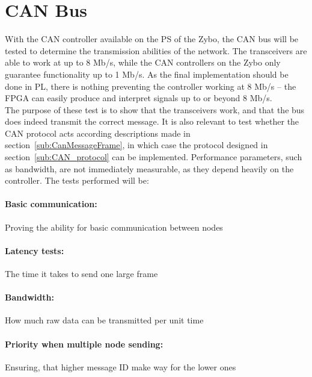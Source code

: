 
\section{CAN Bus}
\label{sub:CAN_Bus_Tests}
With the CAN controller available on the PS of the Zybo, the CAN bus will be tested to determine the transmission abilities of the network.
The transceivers are able to work at up to 8 Mb/s, while the CAN controllers on the Zybo only guarantee functionality up to 1 Mb/s. 
As the final implementation should be done in PL, there is nothing preventing the controller working at 8 Mb/s -- the FPGA can easily produce and interpret signals up to or beyond 8 Mb/s.\\

The purpose of these test is to show that the transceivers work, and that the bus does indeed transmit the correct message. 
It is also relevant to test whether the CAN protocol acts according descriptions made in section~\ref{sub:CanMessageFrame}, in which case the protocol designed in section~\ref{sub:CAN_protocol} can be implemented.
Performance parameters, such as bandwidth, are not immediately measurable, as they depend heavily on the controller.
The tests performed will be: 
\paragraph{Basic communication:} Proving the ability for basic communication between nodes

\paragraph{Latency tests:} The time it takes to send one large frame
 
\paragraph{Bandwidth:} How much raw data can be transmitted per unit time

\paragraph{Priority when multiple node sending:} Ensuring, that higher message ID make way for the lower ones 

